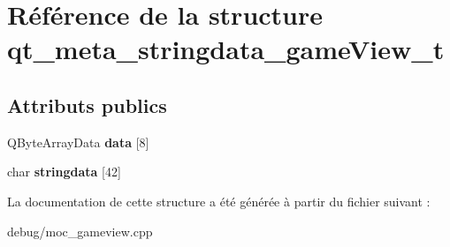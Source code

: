 \hypertarget{structqt__meta__stringdata__game_view__t}{}\section{Référence de la structure qt\+\_\+meta\+\_\+stringdata\+\_\+game\+View\+\_\+t}
\label{structqt__meta__stringdata__game_view__t}
\subsection*{Attributs publics}
\begin{DoxyCompactItemize}
\item 
\mbox{\label{structqt__meta__stringdata__game_view__t_ae74d893c7bab9e226087632cf16d598d}} 
Q\+Byte\+Array\+Data {\bfseries data} \mbox{[}8\mbox{]}
\item 
\mbox{\label{structqt__meta__stringdata__game_view__t_af7ec4eb854d3fda4ea4264eb44475a12}} 
char {\bfseries stringdata} \mbox{[}42\mbox{]}
\end{DoxyCompactItemize}


La documentation de cette structure a été générée à partir du fichier suivant \+:\begin{DoxyCompactItemize}
\item 
debug/moc\+\_\+gameview.\+cpp\end{DoxyCompactItemize}
